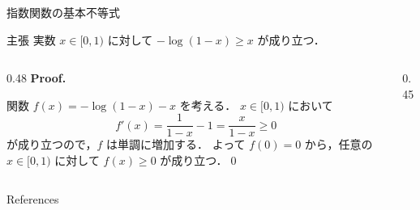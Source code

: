 \documentclass[aspectratio=169]{beamer}
\begin{document}
\begin{frame}[label=exponential-inequality]{指数関数の基本不等式}
	\begin{block}{主張}
		実数 \(x \in [0, 1)\) に対して \( - \log(1 - x) \ge x \) が成り立つ．
	\end{block}

	\begin{columns}[T]
		\begin{column}{0.48\textwidth}
			\textbf{Proof. }

			関数 \(f(x) = -\log(1 - x) - x\) を考える．
			\(x\in[0,1)\) において
			\[
				f'(x) = \frac{1}{1 - x} - 1 = \frac{x}{1 - x} \ge 0
			\]
			が成り立つので，\(f\) は単調に増加する．
			よって \(f(0)=0\) から，任意の \(x\in[0,1)\) に対して
			\(f(x)\ge 0\) が成り立つ．\hfill\qed

			\hfill \hyperlink{iterations<2>}{}
		\end{column}

		\begin{column}{0.45\textwidth}
		\end{column}

	\end{columns}
\end{frame}


\begin{frame}[allowframebreaks]{References}
	\printbibliography[heading=none]{}
\end{frame}
\end{document}
